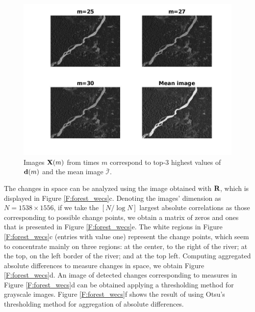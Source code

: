 \documentclass[journal]{IEEEtran}
\newcommand{\vd}{{\textbf d}}
\newcommand{\vR}{{\textbf R}}
\newcommand{\vX}{{\textbf X}}
\begin{document}
\begin{figure}[htp!]
\includegraphics[scale=.3]{../../figs/forest_changes_time} 
\caption{Images $\vX(m)$ from times $m$ correspond to top-3 highest values of $\vd(m)$ and the mean image $\bar{\mathcal{I}}$.}
\label{F:forest_change_times}
\end{figure}

The changes in space can be analyzed using the image obtained with $\vR$, which is displayed in Figure \ref{F:forest_wecs}c. Denoting the images' dimension as $N=1538\times1556$, if we take the $[N/\log N]$ largest absolute correlations as those corresponding to possible change points, we obtain a matrix of zeros and ones that is presented in Figure \ref{F:forest_wecs}e. The white regions in Figure \ref{F:forest_wecs}c (entries with value one) represent the change points, which seem to concentrate mainly on three regions: at the center, to the right of the river; at the top, on the left border of the river; and at the top left. Computing aggregated absolute differences to measure changes in space, we obtain Figure \ref{F:forest_wecs}d. An image of detected changes corresponding to measures in  Figure \ref{F:forest_wecs}d can be obtained applying a thresholding method for grayscale images.  Figure \ref{F:forest_wecs}f shows the result of using Otsu's thresholding method \cite{otsu1979threshold} for aggregation of absolute differences.
\end{document}
